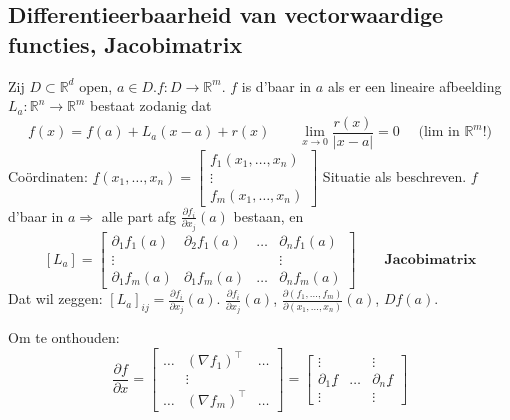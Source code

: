 \documentclass[a4paper]{exam}
\theoremstyle{definition}
\begin{document}
		\subsection{Differentieerbaarheid van vectorwaardige functies, Jacobimatrix}
			Zij $D \subset \mathbb{R}^d$ open, $a \in D. f: D \rightarrow \mathbb{R}^m$. $f$ is d'baar in $a$ als er een lineaire afbeelding $L_a :\mathbb{R}^n \rightarrow \mathbb{R}^m$ bestaat zodanig dat \[f(x)=f(a)+L_a (x-a) + r(x) \qquad \lim_{x \rightarrow 0} \frac{r(x)}{|x-a|} =0 \quad\text{ (lim in } \mathbb{R}^m \text{!)}\]
			Co\"ordinaten: $\underline{f}(x_1,\dots ,x_n)=\begin{bmatrix}
				f_1 (x_1, \dots ,x_n) \\
				\vdots \\
				f_m (x_1, \dots ,x_n)
			\end{bmatrix}$
			\theorem[en definitie] Situatie als beschreven. $f$ d'baar in $a \Rightarrow$ alle part afg $\frac{\partial f_i}{\partial x_j}(a)$ bestaan, en
			\[[L_a] = \begin{bmatrix}
				\partial_1 f_1 (a) & \partial_2 f_1 (a) & \dots &\partial_n f_1 (a) \\
				\vdots & & & \vdots \\
				\partial_1 f_m (a) & \partial_1 f_m (a) & \dots &\partial_n f_m (a)
			\end{bmatrix} \qquad \textbf{Jacobimatrix}\]
			Dat wil zeggen: $[L_a]_{ij}=\frac{\partial f_i}{\partial x_j}(a)$.
			\nota $\frac{\partial f_i}{\partial x_j}(a)$, $\frac{\partial (f_1,\dots,f_m)}{\partial (x_1,\dots,x_n)}(a)$, $ Df(a) $.
			
			Om te onthouden:
			\[ \frac{\partial f}{\partial x} = \begin{bmatrix}
			\dots & (\nabla f_1)^\top & \dots \\
			& \vdots & \\
			\dots & (\nabla f_m)^\top & \dots
			\end{bmatrix} =
			\begin{bmatrix}
			\vdots & & \vdots \\
			\partial_1 \underline{f} & \dots & \partial_n \underline{f} \\
			\vdots & & \vdots
			\end{bmatrix}\]
			
\end{document}

